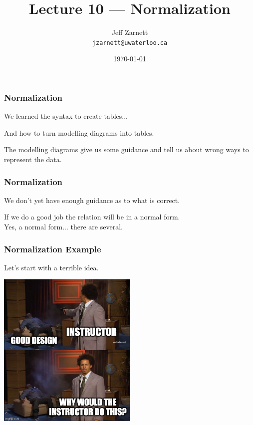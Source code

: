 

\title{Lecture 10 --- Normalization }

\author{Jeff Zarnett \\ \small \texttt{jzarnett@uwaterloo.ca}}
\date{\today}




\begin{frame}
  \titlepage

 \end{frame}



\begin{frame}
\frametitle{Normalization}

We learned the syntax to create tables...

And how to turn modelling diagrams into tables. 

The modelling diagrams give us some guidance and tell us about wrong ways to represent the data.

 \end{frame}



\begin{frame}
\frametitle{Normalization}


We don't yet have enough guidance as to what is correct. 

If we do a good job the relation will be in a \alert{normal form}. \\
\quad Yes, \alert{a} normal form... there are several.

\end{frame}



\begin{frame}
\frametitle{Normalization Example}

Let's start with a terrible idea. 

\begin{center}
	\includegraphics[width=0.5\textwidth]{images/bad-example.jpg}
\end{center}


\end{frame}



